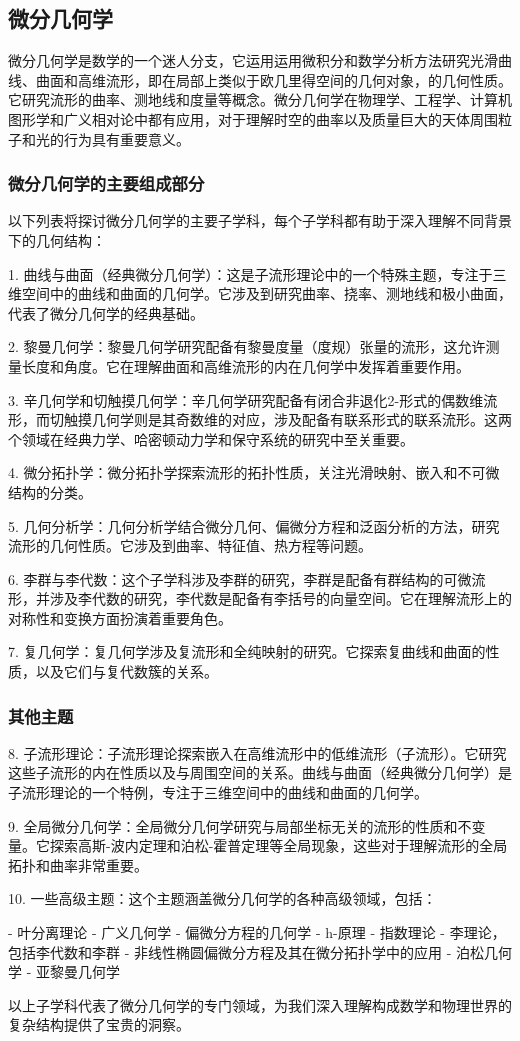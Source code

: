 
\subsection{微分几何学}

微分几何学是数学的一个迷人分支，它运用运用微积分和数学分析方法研究光滑曲线、曲面和高维流形，即在局部上类似于欧几里得空间的几何对象，的几何性质。它研究流形的曲率、测地线和度量等概念。微分几何学在物理学、工程学、计算机图形学和广义相对论中都有应用，对于理解时空的曲率以及质量巨大的天体周围粒子和光的行为具有重要意义。

\subsubsection{微分几何学的主要组成部分}

以下列表将探讨微分几何学的主要子学科，每个子学科都有助于深入理解不同背景下的几何结构：

1. 曲线与曲面（经典微分几何学）：这是子流形理论中的一个特殊主题，专注于三维空间中的曲线和曲面的几何学。它涉及到研究曲率、挠率、测地线和极小曲面，代表了微分几何学的经典基础。

2. 黎曼几何学：黎曼几何学研究配备有黎曼度量（度规）张量的流形，这允许测量长度和角度。它在理解曲面和高维流形的内在几何学中发挥着重要作用。

3. 辛几何学和切触摸几何学：辛几何学研究配备有闭合非退化2-形式的偶数维流形，而切触摸几何学则是其奇数维的对应，涉及配备有联系形式的联系流形。这两个领域在经典力学、哈密顿动力学和保守系统的研究中至关重要。

4. 微分拓扑学：微分拓扑学探索流形的拓扑性质，关注光滑映射、嵌入和不可微结构的分类。

5. 几何分析学：几何分析学结合微分几何、偏微分方程和泛函分析的方法，研究流形的几何性质。它涉及到曲率、特征值、热方程等问题。

6. 李群与李代数：这个子学科涉及李群的研究，李群是配备有群结构的可微流形，并涉及李代数的研究，李代数是配备有李括号的向量空间。它在理解流形上的对称性和变换方面扮演着重要角色。

7. 复几何学：复几何学涉及复流形和全纯映射的研究。它探索复曲线和曲面的性质，以及它们与复代数簇的关系。

\subsubsection{其他主题}

8. 子流形理论：子流形理论探索嵌入在高维流形中的低维流形（子流形）。它研究这些子流形的内在性质以及与周围空间的关系。曲线与曲面（经典微分几何学）是子流形理论的一个特例，专注于三维空间中的曲线和曲面的几何学。

9. 全局微分几何学：全局微分几何学研究与局部坐标无关的流形的性质和不变量。它探索高斯-波内定理和泊松-霍普定理等全局现象，这些对于理解流形的全局拓扑和曲率非常重要。

10. 一些高级主题：这个主题涵盖微分几何学的各种高级领域，包括：

   - 叶分离理论
   - 广义几何学
   - 偏微分方程的几何学
   - h-原理
   - 指数理论
   - 李理论，包括李代数和李群
   - 非线性椭圆偏微分方程及其在微分拓扑学中的应用
   - 泊松几何学
   - 亚黎曼几何学

以上子学科代表了微分几何学的专门领域，为我们深入理解构成数学和物理世界的复杂结构提供了宝贵的洞察。
